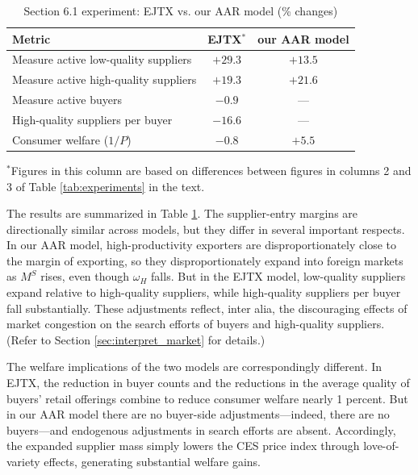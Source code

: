 \documentclass[12pt]{article} \usepackage{amsmath,amssymb,amsthm,geometry,graphicx,setspace,algorithm,algpseudocode,float}
\begin{document}
\begin{table}[h]
  \centering
  \caption{Section 6.1  experiment: EJTX vs. our AAR model (\% changes)}
  \label{tab:policy_shock}
  \begin{tabular}{lcc}
    \toprule
    Metric & EJTX$^*$ & our AAR model \\ \midrule
    Measure active low-quality suppliers & $+29.3$ & $+13.5$ \\
    Measure active high-quality suppliers & $+19.3$ & $+21.6$ \\
    Measure active buyers & $-0.9$ & --- \\
    High-quality suppliers per buyer & $-16.6$ & --- \\
    Consumer welfare ($1/P$) & $-0.8$ & $+5.5$ \\
    \bottomrule
  \end{tabular}
  \par
  \begin{tablenotes}\footnotesize
\medskip
\item [a]$^*$Figures in this column are based on differences between figures in columns 2 and 3 of Table \ref{tab:experiments} in the text.
\end{tablenotes}
\end{table}
\par
The results are summarized in Table \ref{tab:policy_shock}. The supplier-entry margins are directionally similar across models, but they differ in several important respects. In our AAR model, high-productivity exporters are disproportionately close to the margin of exporting, so they disproportionately expand into foreign markets as $M^S$ rises, even though $\omega_H$ falls. But in the EJTX model, low-quality suppliers expand relative to high-quality suppliers, while high-quality suppliers per buyer fall substantially. These adjustments reflect, inter alia, the discouraging effects of market congestion on the search efforts of buyers and high-quality suppliers. (Refer to Section \ref{sec:interpret_market} for details.) 
\par
The welfare implications of the two models are correspondingly different. In EJTX, the reduction in buyer counts and the reductions in the average quality of buyers' retail offerings combine to reduce consumer welfare nearly 1 percent. But in our AAR model there are no buyer-side adjustments---indeed, there are no buyers---and endogenous adjustments in search efforts are absent. Accordingly, the expanded supplier mass simply lowers the CES price index through love-of-variety effects, generating substantial welfare gains.
\end{document}
